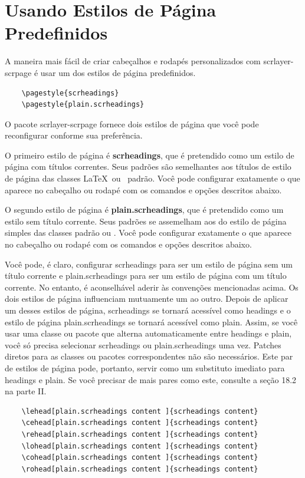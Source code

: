 \chapter{Usando Estilos de Página Predefinidos}
A maneira mais fácil de criar cabeçalhos e rodapés personalizados com scrlayer-scrpage é usar um dos estilos de página predefinidos.

\begin{verbatim}
    \pagestyle{scrheadings}
    \pagestyle{plain.scrheadings} 
\end{verbatim}

O pacote scrlayer-scrpage fornece dois estilos de página que você pode reconfigurar conforme sua preferência.

O primeiro estilo de página é \textbf{scrheadings}, que é pretendido como um estilo de página com títulos correntes. Seus padrões são semelhantes aos títulos de estilo de página das classes \LaTeX\ ou \KOMAScript\ padrão. Você pode configurar exatamente o que aparece no cabeçalho ou rodapé com os comandos e opções descritos abaixo.

O segundo estilo de página é \textbf{plain.scrheadings}, que é pretendido como um estilo sem título corrente. Seus padrões se assemelham aos do estilo de página simples das classes padrão ou \KOMAScript. Você pode configurar exatamente o que aparece no cabeçalho ou rodapé com os comandos e opções descritos abaixo.

Você pode, é claro, configurar scrheadings para ser um estilo de página sem um título corrente e plain.scrheadings para ser um estilo de página com um título corrente. No entanto, é aconselhável aderir às convenções mencionadas acima. Os dois estilos de página influenciam mutuamente um ao outro. Depois de aplicar um desses estilos de página, scrheadings se tornará acessível como headings e o estilo de página plain.scrheadings se tornará acessível como plain. Assim, se você usar uma classe ou pacote que alterna automaticamente entre headings e plain, você só precisa selecionar scrheadings ou plain.scrheadings uma vez. Patches diretos para as classes ou pacotes correspondentes não são necessários. Este par de estilos de página pode, portanto, servir como um substituto imediato para headings e plain. Se você precisar de mais pares como este, consulte a seção 18.2 na parte II.
\begin{verbatim}
    \lehead[plain.scrheadings content ]{scrheadings content}
    \cehead[plain.scrheadings content ]{scrheadings content}
    \rehead[plain.scrheadings content ]{scrheadings content}
    \lohead[plain.scrheadings content ]{scrheadings content}
    \cohead[plain.scrheadings content ]{scrheadings content}
    \rohead[plain.scrheadings content ]{scrheadings content}
\end{verbatim}

